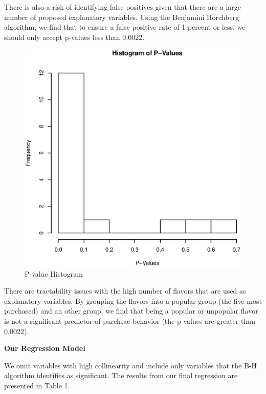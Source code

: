 \documentclass[11pt, fleqn]{article}
\begin{document}
There is also a risk of identifying false positives given that there are a large number of proposed explanatory variables. Using the Benjamini Horchberg algorithm, we find that to ensure a false positive rate of 1 percent or less, we should only accept p-values less than 0.0022.

\begin{figure}[!htb]
\centering
\includegraphics[scale=.5]{pvalue_hist.eps}
\caption{P-value Histogram}
\label{fig:pvalue}
\end{figure}

There are tractability issues with the high number of flavors that are used as explanatory variables. By grouping the flavors into a popular group (the five most purchased) and an other group, we find that being a popular or unpopular flavor is not a significant predictor of purchsae behavior (the p-values are greater than 0.0022).

\textbf{Our Regression Model}

We omit variables with high collinearity and include only variables that the B-H algorithm identifies as significant. The results from our final regression are presented in Table 1.
\end{document}

